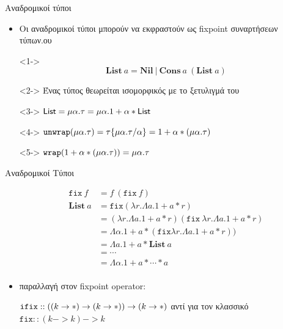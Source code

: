 \documentclass[10pt]{beamer}
\begin{document}
\begin{frame}{Αναδρομικοί τύποι}
    \begin{itemize}
    \item
    Οι αναδρομικοί τύποι μπορούν να εκφραστούν ως fixpoint συναρτήσεων
    τύπων.ου
    \item[]<1->
    \begin{displaymath}
         \textbf{List} ~a = \textbf{Nil} ~|  ~\textbf{Cons} ~a  ~(\textbf{List} ~a)
        \end{displaymath}
    \item[]<2->
    Ένας τύπος θεωρείται ισομορφικός με το ξετυλιγμά του
    \item[]<3->
         $\operatorname{\textsf{List}} = \mu \alpha. \tau = \mu \alpha. 1 + \alpha*\operatorname{\textsf{List}}$ \\
    \item[]<4->
         $\operatorname{\texttt{unwrap}} (\mu \alpha. \tau) = \tau\{\mu \alpha. \tau / \alpha\} =
         1 + \alpha * (\mu \alpha. \tau)$ \\
    \item[]<5->
        $ \operatorname{\texttt{wrap}} ( 1 + \alpha * (\mu \alpha. \tau)) =
         \mu \alpha. \tau$ \\
    \end{itemize}
\end{frame}

\begin{frame}{Αναδρομικοί Τύποι}

\begin{itemize}
\item[]
\begin{align*}
 \texttt{fix} \ f &= f \ (\texttt{fix} \ f)   \\
\textbf{List} ~a &= \texttt{fix} (\lambda r . \Lambda a. 1 + a * r) \\
&= (\lambda r. \Lambda a. 1 + a * r) (\texttt{fix} \ \lambda r. \Lambda a. 1 + a * r)  \\
&= \Lambda \alpha. 1 + a*(\texttt{fix} \lambda r. \Lambda a. 1 + a * r)) \\
 &= \Lambda a. 1 + a * \textbf{List} ~a \\
 &= \cdots \\
&= \Lambda \alpha. 1+ a * \cdots * a \\ 
\end{align*}

 \item<2-> παραλλαγή στον fixpoint operator:

        $\operatorname{\texttt{ifix}} :: ((k -> *) -> (k -> *)) -> (k -> *)$
        αντί για τον κλασσικό \\
        $\texttt{fix} :: (k -> k) -> k$
    \end{itemize}

\end{frame}
\end{document}
